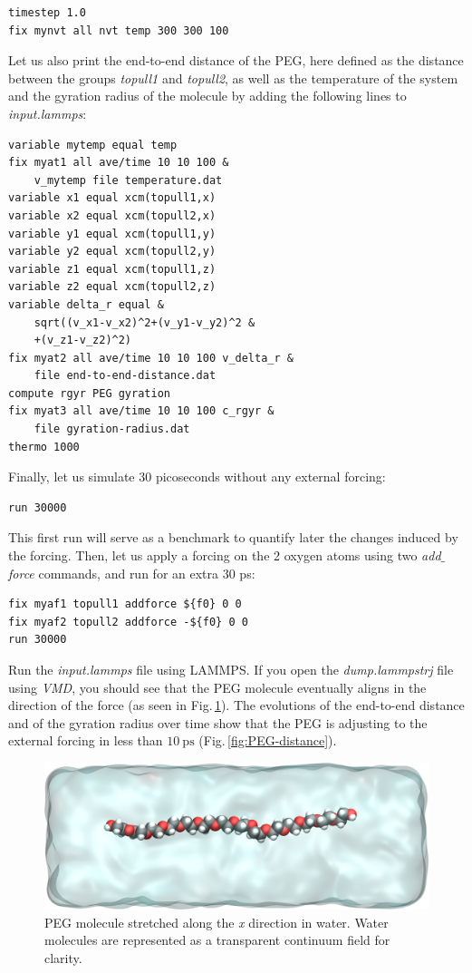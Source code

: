 \documentclass[9pt,tutorial]{livecoms}
\begin{document}
{\normalsize \begin{verbatim}
timestep 1.0
fix mynvt all nvt temp 300 300 100
\end{verbatim}}
Let us also print the end-to-end distance of the PEG,
here defined as the distance between the groups \textit{topull1}
and \textit{topull2}, as well as the temperature of the system and the gyration
radius of the molecule \cite{fixmanRadiusGyrationPolymer1962a}
by adding the following lines to \textit{input.lammps}:
{\normalsize \begin{verbatim}
variable mytemp equal temp
fix myat1 all ave/time 10 10 100 &
    v_mytemp file temperature.dat
variable x1 equal xcm(topull1,x)
variable x2 equal xcm(topull2,x)
variable y1 equal xcm(topull1,y)
variable y2 equal xcm(topull2,y)
variable z1 equal xcm(topull1,z)
variable z2 equal xcm(topull2,z)
variable delta_r equal &
    sqrt((v_x1-v_x2)^2+(v_y1-v_y2)^2 &
    +(v_z1-v_z2)^2)
fix myat2 all ave/time 10 10 100 v_delta_r &
    file end-to-end-distance.dat
compute rgyr PEG gyration
fix myat3 all ave/time 10 10 100 c_rgyr &
    file gyration-radius.dat
thermo 1000
\end{verbatim}}
Finally, let us simulate 30 picoseconds without any external forcing:
{\normalsize \begin{verbatim}
run 30000
\end{verbatim}}
This first run will serve as a benchmark to quantify later the changes induced by the forcing. Then, let us apply a forcing on the 2 oxygen atoms using two \textit{add$\_$force} commands, and run for an extra 30 ps:
{\normalsize \begin{verbatim}
fix myaf1 topull1 addforce ${f0} 0 0
fix myaf2 topull2 addforce -${f0} 0 0
run 30000
\end{verbatim}}
Run the \textit{input.lammps} file using LAMMPS. If you open the \textit{dump.lammpstrj} file using \textit{VMD}, you should see that the PEG molecule eventually aligns in the direction of the force (as seen in Fig.\,\ref{fig:PEG-in-water}). The evolutions of the end-to-end distance and of the gyration radius over time show that the PEG is adjusting to the external forcing in less than $10~\text{ps}$ (Fig.\,\ref{fig:PEG-distance}).

\begin{figure}
\centering
\includegraphics[width=\linewidth]{PEG-in-water}
\caption{PEG molecule stretched along the \textit{x} direction in water. Water molecules are represented as a transparent continuum field for clarity.}
\label{fig:PEG-in-water}
\end{figure}
\end{document}
